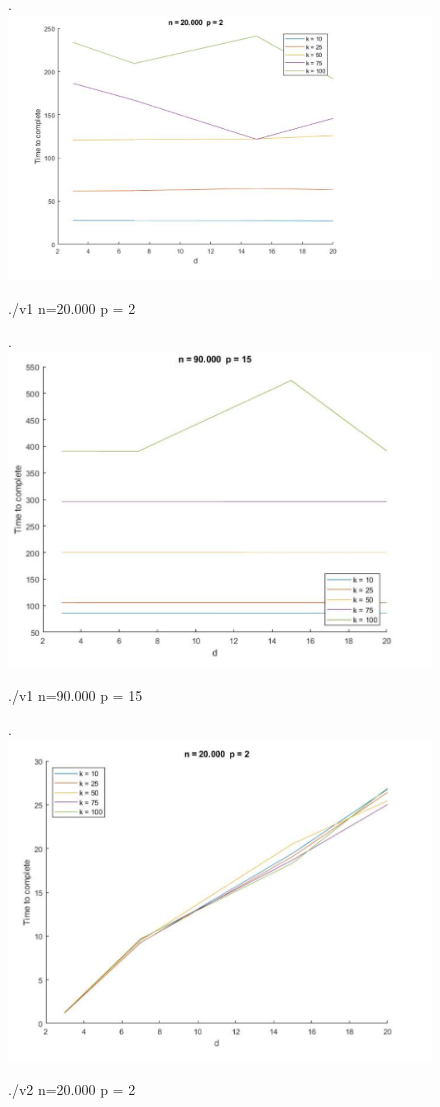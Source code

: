 \documentclass[10pt]{report}
\begin{document}
\begin{figure}[H]
\centering
\left.
\includegraphics[scale=0.4]{../plots/v1_diagram_Random_array_.png}
\caption{./v1 n=20.000 p = 2}
\end{figure} 
\begin{figure}[H]
\centering
\left.
\includegraphics[scale=0.4]{../plots/v1_diagram_Random_array_2.png}
\caption{./v1 n=90.000 p = 15}
\end{figure} 
\begin{figure}[H]
\centering
\left.
\includegraphics[scale=0.4]{../plots/v2_diagram_Random_array_.png}
\caption{./v2 n=20.000 p = 2}
\end{figure} 
\end{document}
